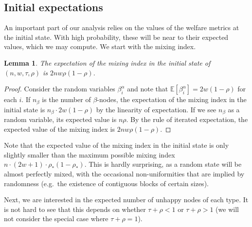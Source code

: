 \documentclass[11pt]{article}
\theoremstyle{plain}
\newtheorem{lem}[thm]{Lemma}
\numberwithin{equation}{subsection}
\DeclareRobustCommand{\expe}[2][{\mbox{$\mathbb{E}$}}]{\ensuremath {#1}\left[ {#2} \right]}
\begin{document}
\subsection{Initial expectations}\label{sub:initexpect} 
An important part of our analysis relies on the values of
the welfare metrics at the initial state. With high probability, these will be near to
their expected values, which we may compute.
We start with the mixing index.
 \begin{lem}\label{eq:expecmixind}
The expectation of the mixing index in the initial state of $(n,w,\tau,\rho)$ is
$2nw\rho(1-\rho)$.
\end{lem}
\begin{proof}
Consider the random variables $\beta_i^{\alpha}$
and note that $\expe{\beta_i^{\alpha}}=2w(1-\rho)$ for each $i$. 
If $n_{\beta}$ is the number of $\beta$-nodes, the expectation of the mixing index
in the initial state is $n_{\beta}\cdot 2w(1-\rho)$ by the linearity of expectation. 
If we see $n_{\beta}$ as a random variable, its expected value
is $n\rho$. By the rule of iterated expectation, 
the expected value of the mixing index is $2nw\rho(1-\rho)$.
\end{proof}

Note that the expected value of the mixing index in the initial
state is only slightly smaller than the maximum possible
mixing index $n\cdot (2w+1)\cdot \rho_{\ast}(1-\rho_{\ast})$. This is hardly
surprising, as a random state will be almost perfectly mixed, with the occasional
non-uniformities that are implied by randomness (e.g.\ the existence of contiguous blocks
of certain sizes).
 
Next, we are interested in the expected number of unhappy nodes of each type.
It is not hard to see that this depends on whether
$\tau+\rho<1$ or $\tau+\rho>1$ (we will not consider the special case where
$\tau+\rho=1$). 
\end{document}
